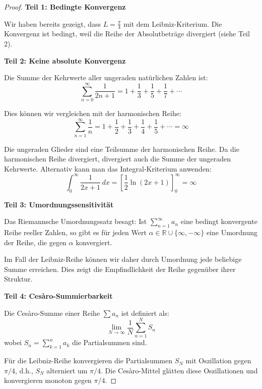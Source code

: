 \documentclass[a4paper,12pt,twoside]{report}
\theoremstyle{definition}
\begin{document}
\begin{proof}
\textbf{Teil 1: Bedingte Konvergenz}

Wir haben bereits gezeigt, dass $L = \frac{\pi}{4}$ mit dem Leibniz-Kriterium. Die Konvergenz ist bedingt, weil die Reihe der Absolutbeträge divergiert (siehe Teil 2).

\textbf{Teil 2: Keine absolute Konvergenz}

Die Summe der Kehrwerte aller ungeraden natürlichen Zahlen ist:
\begin{equation}
\sum_{n=0}^{\infty} \frac{1}{2n+1} = 1 + \frac{1}{3} + \frac{1}{5} + \frac{1}{7} + \cdots
\end{equation}

Dies können wir vergleichen mit der harmonischen Reihe:
\begin{equation}
\sum_{n=1}^{\infty} \frac{1}{n} = 1 + \frac{1}{2} + \frac{1}{3} + \frac{1}{4} + \frac{1}{5} + \cdots = \infty
\end{equation}

Die ungeraden Glieder sind eine Teilsumme der harmonischen Reihe. Da die harmonischen Reihe divergiert, divergiert auch die Summe der ungeraden Kehrwerte. Alternativ kann man das Integral-Kriterium anwenden:
\begin{equation}
\int_0^{\infty} \frac{1}{2x+1} \, dx = \left[\frac{1}{2} \ln(2x+1)\right]_0^{\infty} = \infty
\end{equation}

\textbf{Teil 3: Umordnungssensitivität}

Das Riemannsche Umordnungssatz besagt: Ist $\sum_{n=1}^{\infty} a_n$ eine bedingt konvergente Reihe reeller Zahlen, so gibt es für jeden Wert $\alpha \in \mathbb{R} \cup \{\infty, -\infty\}$ eine Umordnung der Reihe, die gegen $\alpha$ konvergiert.

Im Fall der Leibniz-Reihe können wir daher durch Umordnung jede beliebige Summe erreichen. Dies zeigt die Empfindlichkeit der Reihe gegenüber ihrer Struktur.

\textbf{Teil 4: Cesàro-Summierbarkeit}

Die Cesàro-Summe einer Reihe $\sum a_n$ ist definiert als:
\begin{equation}
\lim_{N \to \infty} \frac{1}{N} \sum_{n=1}^{N} S_n
\end{equation}
wobei $S_n = \sum_{k=1}^{n} a_k$ die Partialsummen sind.

Für die Leibniz-Reihe konvergieren die Partialsummen $S_N$ mit Oszillation gegen $\pi/4$, d.h., $S_N$ alterniert um $\pi/4$. Die Cesàro-Mittel glätten diese Oszillationen und konvergieren monoton gegen $\pi/4$.
\end{proof}
\end{document}
